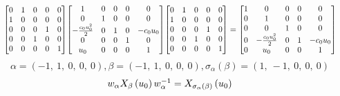 \documentclass[11pt]{article}
\theoremstyle{definition}
\begin{document}
\[
\scaletoalign{\textwidth}{{\left[\begin{matrix}0 & 1 & 0 & 0 & 0\\1 & 0 & 0 & 0 & 0\\0 & 0 & 0 & 1 & 0\\0 & 0 & 1 & 0 & 0\\0 & 0 & 0 & 0 & 1\end{matrix}\right]} {\left[\begin{matrix}1 & 0 & 0 & 0 & 0\\0 & 1 & 0 & 0 & 0\\- \frac{c_{0} u_{0}^{2}}{2} & 0 & 1 & 0 & - c_{0} u_{0}\\0 & 0 & 0 & 1 & 0\\u_{0} & 0 & 0 & 0 & 1\end{matrix}\right]} {\left[\begin{matrix}0 & 1 & 0 & 0 & 0\\1 & 0 & 0 & 0 & 0\\0 & 0 & 0 & 1 & 0\\0 & 0 & 1 & 0 & 0\\0 & 0 & 0 & 0 & 1\end{matrix}\right]} = {\left[\begin{matrix}1 & 0 & 0 & 0 & 0\\0 & 1 & 0 & 0 & 0\\0 & 0 & 1 & 0 & 0\\0 & - \frac{c_{0} u_{0}^{2}}{2} & 0 & 1 & - c_{0} u_{0}\\0 & u_{0} & 0 & 0 & 1\end{matrix}\right]}}
\]
\[
\alpha = \left( -1, \  1, \  0, \  0, \  0\right), \beta = \left( -1, \  1, \  0, \  0, \  0\right), \sigma_{\alpha}(\beta) = \left( 1, \  -1, \  0, \  0, \  0\right)
\]
\[
\scaletoalign{\textwidth}{w_{\alpha} X_{\beta}\left(u_{0}\right) w_{\alpha}^{-1} = X_{\sigma_{\alpha}\left(\beta\right)}\left(u_{0}\right)}
\]
\end{document}
